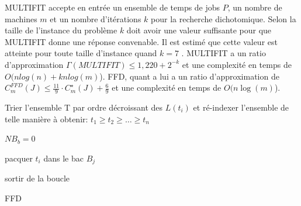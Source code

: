 \documentclass[a4paper,12pt]{report}
\theoremstyle{plain}				%
\theoremstyle{definition}				%
\newcommand{\fco}[1]{\todo[author=FCO,color=teal,inline]{#1}}
\begin{document}
MULTIFIT accepte en entrée un ensemble de temps de jobs $P$, 
  un nombre de machines $m$ et 
  un nombre d'itérations $k$ pour la recherche dichotomique.
Selon la taille de l'instance du problème $k$ doit avoir une valeur suffisante pour que 
  MULTIFIT donne une réponse convenable. 
Il est estimé que cette valeur est atteinte pour toute taille d'instance 
  quand $k=7$ \cite{coffman1978application}.
MULTIFIT a 
  un ratio d'approximation $\Gamma(MULTIFIT) \leq 1,220 + 2^{-k}$ et 
  une complexité en temps de $ O(n log(n) + kn log(m)$).
FFD, quant a lui a 
  un ratio d'approximation de $C_m^{FFD}(J) \leq \frac{11}{9} \cdot C_m^\star(J) + \frac{6}{9}$ 
  \cite{dosa2007tight} et une complexité en temps de $ O(n \log(m)$).

\bigskip
\begin{algorithm}[H]
\DontPrintSemicolon
{}

\BlankLine %

Trier l'ensemble T par ordre décroissant des $L(t_i)$ et  
ré-indexer l'ensemble de telle manière à obtenir:
$t_1 \geq t_2 \geq \ldots \geq t_n$

$NB_b = 0$ 

 {
	 {
		 {
			pacquer $t_i$ dans le bac $B_j$
			
			sortir de la boucle
		}
	}
}
\caption{FFD}
\label{algo:FFD}
\end{algorithm}

\end{document}
